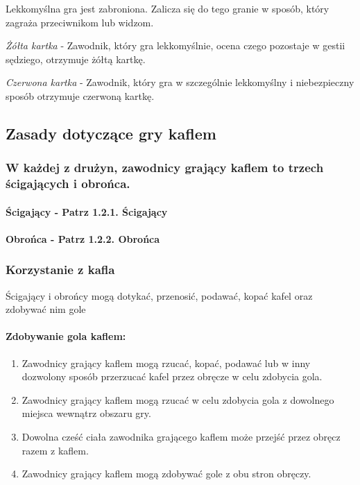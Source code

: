 \documentclass[12pt]{article}
\begin{document}
Lekkomyślna gra jest zabroniona. Zalicza się do tego granie w sposób,
który zagraża przeciwnikom lub widzom.

\emph{Żółta kartka} - Zawodnik, który gra lekkomyślnie, ocena czego
pozostaje w gestii sędziego, otrzymuje żółtą kartkę.

\emph{Czerwona kartka} - Zawodnik, który gra w szczególnie lekkomyślny i
niebezpieczny sposób otrzymuje czerwoną kartkę.

\subsection{Zasady dotyczące gry kaflem}

\subsubsection{W każdej z drużyn, zawodnicy grający kaflem to trzech ścigających
i obrońca.}

\paragraph{Ścigający - Patrz 1.2.1. Ścigający}

\paragraph{Obrońca - Patrz 1.2.2. Obrońca}

\subsubsection{Korzystanie z kafla}

Ścigający i obrońcy mogą dotykać, przenosić, podawać, kopać kafel oraz
zdobywać nim gole

\paragraph{Zdobywanie gola kaflem:}

\begin{enumerate}
\item
    Zawodnicy grający kaflem mogą rzucać, kopać, podawać lub w inny
  dozwolony sposób przerzucać kafel przez obręcze w celu zdobycia gola.
  \item
    Zawodnicy grający kaflem mogą rzucać w celu zdobycia gola z dowolnego
  miejsca wewnątrz obszaru gry.
  \item
    Dowolna cześć ciała zawodnika grającego kaflem może przejść przez
  obręcz razem z kaflem.
  \item
    Zawodnicy grający kaflem mogą zdobywać gole z obu stron obręczy.
  \end{enumerate}
\end{document}
